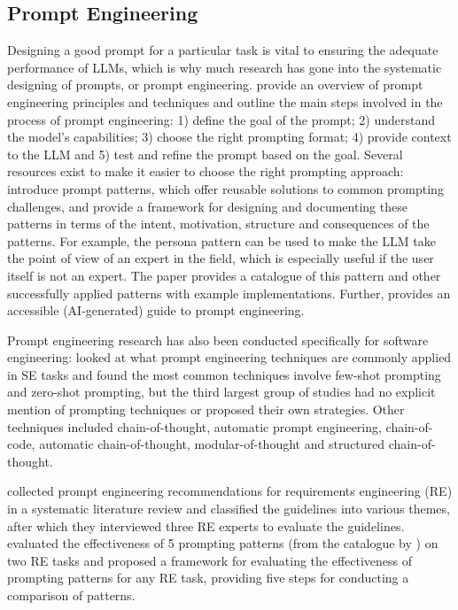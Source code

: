 \documentclass[a4paper]{article}
\begin{document}
\subsection{Prompt Engineering} \label{Prompt Engineering}
Designing a good prompt for a particular task is vital to ensuring the adequate performance of LLMs, which is why much research has gone into the systematic designing of prompts, or prompt engineering. \textcite{Marvin2024} provide an overview of prompt engineering principles and techniques and outline the main steps involved in the process of prompt engineering: 1) define the goal of the prompt; 2) understand the model's capabilities; 3) choose the right prompting format; 4) provide context to the LLM and 5) test and refine the prompt based on the goal. Several resources exist to make it easier to choose the right prompting approach: \textcite{white2023} introduce prompt patterns, which offer reusable solutions to common prompting challenges, and provide a framework for designing and documenting these patterns in terms of the intent, motivation, structure and consequences of the patterns. For example, the persona pattern can be used to make the LLM take the point of view of an expert in the field, which is especially useful if the user itself is not an expert. The paper provides a catalogue of this pattern and other successfully applied patterns with example implementations. Further, \textcite{ekin2023} provides an accessible (AI-generated) guide to prompt engineering.

Prompt engineering research has also been conducted specifically for software engineering: \textcite{hou2024} looked at what prompt engineering techniques are commonly applied in SE tasks and found the most common techniques involve few-shot prompting and zero-shot prompting, but the third largest group of studies had no explicit mention of prompting techniques or proposed their own strategies. Other techniques included chain-of-thought, automatic prompt engineering, chain-of-code, automatic chain-of-thought, modular-of-thought and structured chain-of-thought.

\textcite{arvidsson2023} collected prompt engineering recommendations for requirements engineering (RE) in a systematic literature review and classified the guidelines into various themes, after which they interviewed three RE experts to evaluate the guidelines. \textcite{ronanki2023} evaluated the effectiveness of 5 prompting patterns (from the catalogue by \textcite{white2023}) on two RE tasks and proposed a framework for evaluating the effectiveness of prompting patterns for any RE task, providing five steps for conducting a comparison of patterns.
\end{document}
